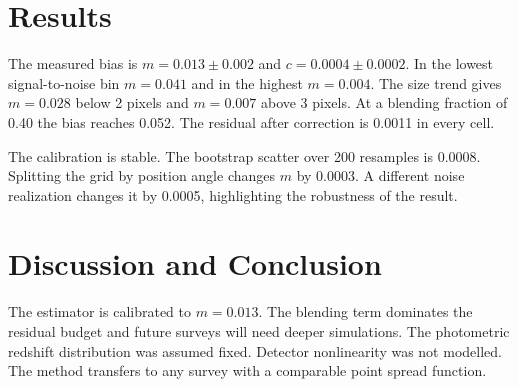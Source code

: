 \documentclass{article}
\newcommand{\mbias}{0.013}
\newcommand{\cbias}{0.0004}
\begin{document}
\section{Results}

The measured bias is $m = \mbias \pm 0.002$ and $c = \cbias \pm 0.0002$. In the
lowest signal-to-noise bin $m = 0.041$ and in the highest $m = 0.004$. The
size trend gives $m = 0.028$ below 2 pixels and $m = 0.007$ above 3 pixels. At
a blending fraction of 0.40 the bias reaches 0.052. The residual after
correction is 0.0011 in every cell.

The calibration is stable. The bootstrap scatter over 200 resamples is 0.0008.
Splitting the grid by position angle changes $m$ by 0.0003. A different noise
realization changes it by 0.0005, highlighting the robustness of the result.

\section{Discussion and Conclusion}

The estimator is calibrated to $m = \mbias$. The blending term dominates the
residual budget and future surveys will need deeper simulations. The
photometric redshift distribution was assumed fixed. Detector nonlinearity was
not modelled. The method transfers to any survey with a comparable point
spread function.
\end{document}
